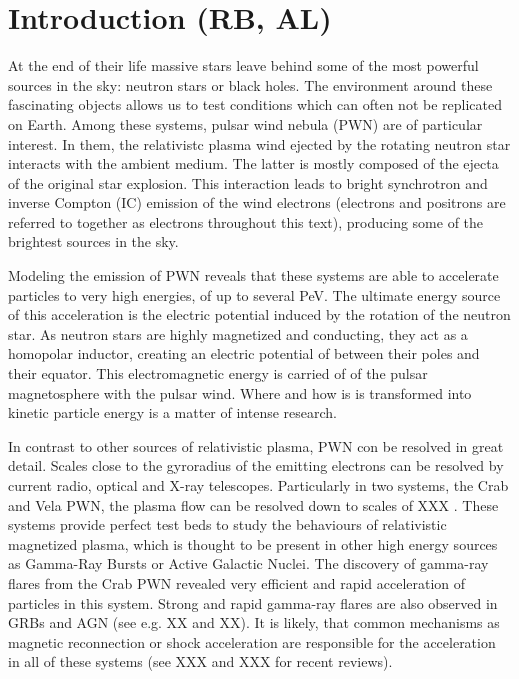 \section{Introduction (RB, AL)}
At the end of their life massive stars leave behind some of the most powerful sources in the sky: neutron stars or black holes. The environment around these fascinating objects allows
us to test conditions which can often not be replicated on Earth. Among these systems, pulsar wind nebula (PWN) are of particular interest. In them, the relativistc plasma wind ejected by the rotating neutron star interacts with the ambient medium. The latter is mostly composed of the ejecta of the original star explosion. This interaction leads to bright synchrotron and inverse Compton (IC) emission of the wind electrons (electrons and positrons are referred to together as electrons throughout this text), producing some of the brightest sources in the sky.

Modeling the emission of PWN reveals that these systems are able to accelerate particles to very high energies, of up to several PeV. The ultimate energy source of this acceleration is the electric potential induced by the rotation of the neutron star. As neutron stars are highly magnetized and conducting, they act as a homopolar inductor, creating an electric potential of between their poles and their equator. This electromagnetic energy is carried of of the pulsar magnetosphere with the pulsar wind. Where and how is is transformed into kinetic particle energy is a matter of intense research.

In contrast to other sources of relativistic plasma, PWN con be resolved in great detail. Scales close to the gyroradius of the emitting electrons can be resolved by current radio, optical and X-ray telescopes. Particularly in two systems, the Crab and Vela PWN, the plasma flow can be resolved down to scales of XXX . These systems provide perfect test beds to study the behaviours of relativistic magnetized plasma, which is thought to be present in other high energy sources as Gamma-Ray Bursts or Active Galactic Nuclei. The discovery of gamma-ray flares from the Crab PWN revealed very efficient and rapid acceleration of particles in this system. Strong and rapid gamma-ray flares are also observed in GRBs and AGN (see e.g. XX and XX). It is likely, that common mechanisms as magnetic reconnection or shock acceleration are responsible for the acceleration in all of these systems (see XXX and XXX for recent reviews).

